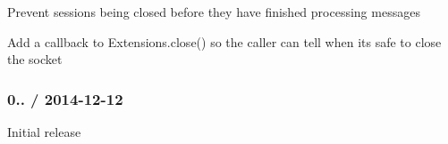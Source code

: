 
\begin{DoxyItemize}
\item Prevent sessions being closed before they have finished processing messages
\item Add a callback to {\ttfamily Extensions.\+close()} so the caller can tell when it\textquotesingle{}s safe to close the socket
\end{DoxyItemize}

\subsubsection*{0.. / 2014-\/12-\/12}


\begin{DoxyItemize}
\item Initial release 
\end{DoxyItemize}